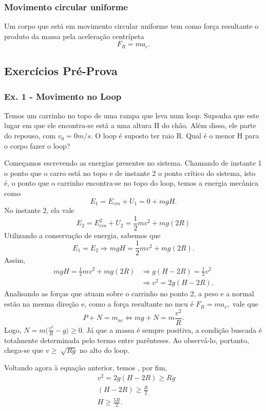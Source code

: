 \documentclass{article}
\begin{document}
\subsubsection{Movimento circular uniforme}
  Um corpo que está em movimento circular uniforme tem como for\c ca resultante o
produto da massa pela acelera\c cão centrípeta 
  \[ 
    F_{R} = ma_{c}.
  \]

\subsection{Exercícios Pré-Prova}
\subsubsection{Ex. 1 - Movimento no Loop}
  Temos um carrinho no topo de uma rampa que leva num loop. Suponha que este lugar
em que ele encontra-se está a uma altura H do chão. Além disso, ele parte do repouso, com \(v_{0}=0m/s\). O loop é suposto ter raio R. Qual
é o menor H para o corpo fazer o loop?

  Come\c camos escrevendo as energias presentes no sistema. Chamando de instante 1 o
ponto que o carro está no topo e de instante 2 o ponto crítico do sistema, isto é, o ponto que o carrinho encontra-se no
topo do loop, temos a energia mecânica como
  \[
    E_{1} = E_{cin} + U_{1} = 0 + mgH.
  \]
No instante 2, ela vale 
  \[
    E_{2} = E_{cin}^{2} + U_{2} = \frac{1}{2}mv^{2} + mg(2R)
  \]
Utilizando a conserva\c cão de energia, sabemos que 
  \[
    E_{1} = E_{2} \Rightarrow mgH = \frac{1}{2}mv^{2} + mg(2R).
  \]
Assim, 
\begin{align*}
  mgH = \frac{1}{2}mv^{2} + mg(2R) &\Rightarrow g(H-2R)=\frac{1}{2}v^{2}\\
                                   &\Rightarrow v^{2} = 2g(H-2R).
\end{align*}
Analisando as for\c cas que atuam sobre o carrinho no ponto 2, a peso e a normal estão na mesma dire\c cão e,
como a for\c ca resultante no mcu é \(F_{R} = ma_{c},\) vale que 
  \[
    P + N = m_{ac} \Longleftrightarrow mg + N = m \frac{v^{2}}{R}.
  \]
Logo, \(N = m\biggl(\frac{v^{2}}{R} - g\biggr)\geq 0\). Já que a massa é sempre positiva,
a condi\c cão buscada é totalmente determinada pelo termo entre parênteses. Ao
observá-lo, portanto, chega-se que \(v\geq \sqrt[]{Rg}\) no alto do loop.

  Voltando agora à equa\c cão anterior, temos , por fim,
 \begin{align*}
   &v^{2} = 2g(H-2R)\geq Rg\\
   &(H-2R)\geq \frac{R}{2}\\
   &H\geq \frac{5R}{2}.
 \end{align*}

\newpage
\end{document}
